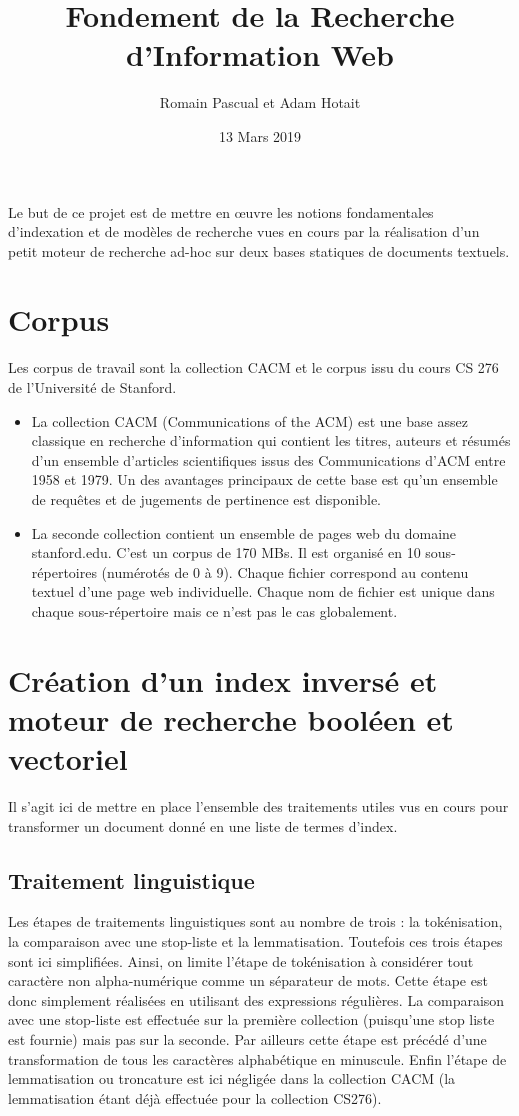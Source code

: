 \documentclass[12pt,a4paper]{article}
\author{Romain Pascual et Adam Hotait}
\date{13 Mars 2019}
\title{Fondement de la Recherche d'Information Web}
\begin{document}
\maketitle

Le but de ce projet est de mettre en \oe{}uvre les notions fondamentales d’indexation et de modèles de recherche vues en cours par la réalisation d’un petit moteur de recherche ad-hoc sur deux bases statiques de documents textuels.

\section{Corpus}
Les corpus de travail sont la collection CACM et le corpus issu du cours CS 276 de
l’Université de Stanford.
\begin{itemize}
\item La collection CACM (Communications of the ACM) est une base assez classique en recherche d’information qui contient les titres, auteurs et résumés d’un ensemble d’articles scientifiques issus des Communications d’ACM entre 1958 et 1979. Un des avantages principaux de cette base est qu’un ensemble de requêtes et de jugements de pertinence est disponible. 
\item La seconde collection contient un ensemble de pages web du domaine stanford.edu. C’est un corpus de 170 MBs. Il est organisé en 10 sous-répertoires (numérotés de 0 à 9). Chaque fichier correspond au contenu textuel d’une page web individuelle. Chaque nom de fichier est unique dans chaque sous-répertoire mais ce n’est pas le cas globalement.
\end{itemize}

\section{Création d’un index inversé et moteur de recherche booléen et vectoriel}

Il s’agit ici de mettre en place l’ensemble des traitements utiles vus en cours pour transformer un document
donné en une liste de termes d’index.

\subsection{Traitement linguistique}
Les étapes de traitements linguistiques sont au nombre de trois : la tokénisation, la comparaison avec une stop-liste et la lemmatisation. Toutefois ces trois étapes sont ici simplifiées. Ainsi, on limite l'étape de tokénisation à considérer tout caractère non alpha-numérique comme un séparateur de mots. Cette étape est donc simplement réalisées en utilisant des expressions régulières. La comparaison avec une stop-liste est effectuée sur la première collection (puisqu'une stop liste est fournie) mais pas sur la seconde. Par ailleurs cette étape est précédé d'une transformation de tous les caractères alphabétique en minuscule. Enfin l'étape de lemmatisation ou troncature est ici négligée dans la collection CACM (la lemmatisation étant déjà effectuée pour la collection CS276).
\end{document}
